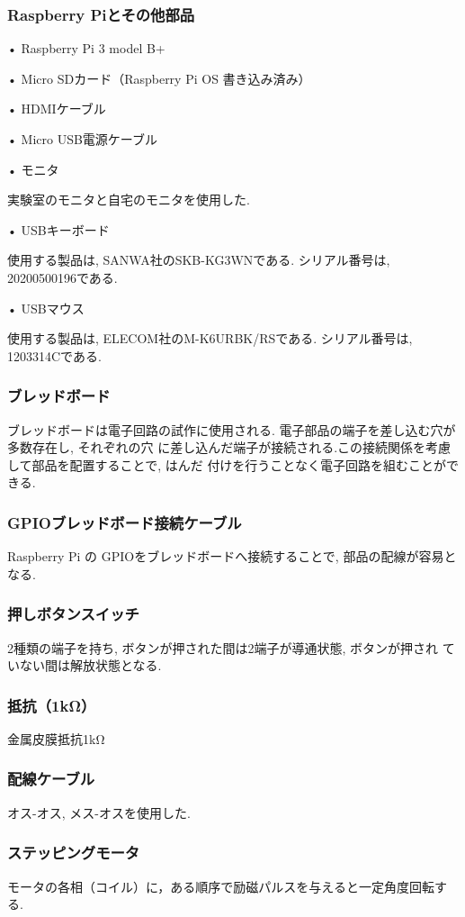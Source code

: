 \documentclass{ltjsarticle} %
\begin{document}
\subsubsection{Raspberry Piとその他部品}
• Raspberry Pi 3 model B+

• Micro SDカード（Raspberry Pi OS 書き込み済み）

• HDMIケーブル

• Micro USB電源ケーブル

• モニタ

実験室のモニタと自宅のモニタを使用した.

• USBキーボード

使用する製品は, SANWA社のSKB-KG3WNである. シリアル番号は, 20200500196である. 

• USBマウス

使用する製品は, ELECOM社のM-K6URBK/RSである. シリアル番号は, 1203314Cである. 


\subsubsection{ブレッドボード}
ブレッドボードは電⼦回路の試作に使⽤される. 電⼦部品の端⼦を差し込む⽳が多数存在し, それぞれの⽳
に差し込んだ端⼦が接続される.この接続関係を考慮して部品を配置することで, はんだ
付けを⾏うことなく電⼦回路を組むことができる.

\subsubsection{GPIOブレッドボード接続ケーブル}
Raspberry Pi の GPIOをブレッドボードへ接続することで, 部品の配線が容易となる.

\subsubsection{押しボタンスイッチ}
2種類の端⼦を持ち, ボタンが押された間は2端⼦が導通状態, ボタンが押され
ていない間は解放状態となる.

\subsubsection{抵抗（1kΩ）}
金属皮膜抵抗1kΩ

\subsubsection{配線ケーブル}
オス-オス, メス-オスを使用した.

\subsubsection{ステッピングモータ}
モータの各相（コイル）に，ある順序で励磁パルスを与えると⼀定⾓度回転する. 
\end{document}
